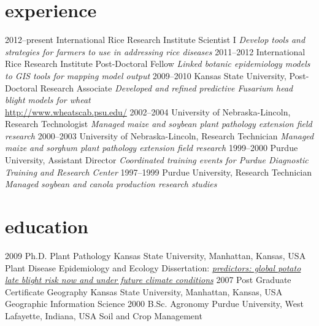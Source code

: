 \section*{experience}
\begin{entrylist}
  \entry
    {2012--present}
    {International Rice Research Institute }
    {Scientist I}
    {\emph{Develop tools and strategies for farmers to use in addressing rice diseases}}
  \entry
    {2011--2012}
    {International Rice Research Institute }
    {Post-Doctoral Fellow}
    {\emph{Linked botanic epidemiology models to GIS tools for mapping model output}}
  \entry
    {2009--2010}
    {Kansas State University, }
    {Post-Doctoral Research Associate}
    {\emph{Developed and refined predictive Fusarium head blight models for wheat}\\
    \href{http://www.wheatscab.psu.edu/}{http://www.wheatscab.psu.edu/}}
  \entry
   {2002--2004}
   {University of Nebraska-Lincoln, }
   {Research Technologist}
   {\emph{Managed maize and soybean plant pathology extension field research}}
  \entry
   {2000--2003}
   {University of Nebraska-Lincoln, }
   {Research Technician}
   {\emph{Managed maize and sorghum plant pathology extension field research}}
  \entry
   {1999--2000}
   {Purdue University, }
   {Assistant Director}
   {\emph{Coordinated training events for Purdue Diagnostic Training and Research Center}}
  \entry
   {1997--1999}
   {Purdue University, }
   {Research Technician}
   {\emph{Managed soybean and canola production research studies}}
\end{entrylist}

\section*{education}

\begin{entrylist}
  \entry
    {2009}
    {Ph.D. {\normalfont Plant Pathology}}
    {Kansas State University, Manhattan, Kansas, USA}
    {Plant Disease Epidemiology and Ecology}
  \entry
    {}
    {Dissertation: }
    {}
      {\emph{\href{https://krex.k-state.edu/dspace/handle/2097/2341?show=full}{predictors: global potato late blight risk now and under future climate conditions}}}
 \entry
    {2007}
    {Post Graduate Certificate {\normalfont Geography}}
    {Kansas State University, Manhattan, Kansas, USA}
    {Geographic Information Science}
  \entry
    {2000}
    {B.Sc. {\normalfont Agronomy}}
    {Purdue University, West Lafayette, Indiana, USA}
    {Soil and Crop Management}
\end{entrylist}
